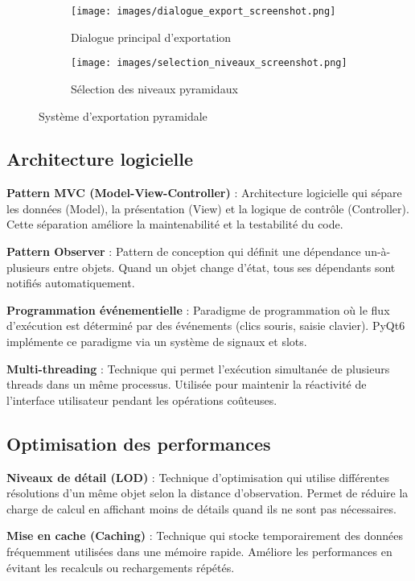 \documentclass[12pt,a4paper]{report}
\begin{document}
\begin{}
\begin{}
\begin{}
\begin{figure}[H]
\centering
\begin{subfigure}{0.48\textwidth}
\texttt{[image: images/dialogue\_export\_screenshot.png]}
\caption{Dialogue principal d'exportation}
\end{subfigure}
\hfill
\begin{subfigure}{0.48\textwidth}
\texttt{[image: images/selection\_niveaux\_screenshot.png]}
\caption{Sélection des niveaux pyramidaux}
\end{subfigure}
\caption{Système d'exportation pyramidale}
\label{fig:export_pyramidal}
\end{figure}

\subsection{Architecture logicielle}

\textbf{Pattern MVC (Model-View-Controller)} : Architecture logicielle qui sépare les données (Model), la présentation (View) et la logique de contrôle (Controller). Cette séparation améliore la maintenabilité et la testabilité du code.

\textbf{Pattern Observer} : Pattern de conception qui définit une dépendance un-à-plusieurs entre objets. Quand un objet change d'état, tous ses dépendants sont notifiés automatiquement.

\textbf{Programmation événementielle} : Paradigme de programmation où le flux d'exécution est déterminé par des événements (clics souris, saisie clavier). PyQt6 implémente ce paradigme via un système de signaux et slots.

\textbf{Multi-threading} : Technique qui permet l'exécution simultanée de plusieurs threads dans un même processus. Utilisée pour maintenir la réactivité de l'interface utilisateur pendant les opérations coûteuses.

\subsection{Optimisation des performances}

\textbf{Niveaux de détail (LOD)} : Technique d'optimisation qui utilise différentes résolutions d'un même objet selon la distance d'observation. Permet de réduire la charge de calcul en affichant moins de détails quand ils ne sont pas nécessaires.

\textbf{Mise en cache (Caching)} : Technique qui stocke temporairement des données fréquemment utilisées dans une mémoire rapide. Améliore les performances en évitant les recalculs ou rechargements répétés.


\end{}
\end{}
\end{}
\end{document}
